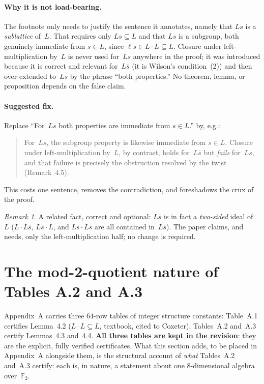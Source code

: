 \documentclass[11pt]{amsart}
\newcommand{\FF}{\mathbb{F}}
\theoremstyle{remark}
\newtheorem*{remarknote}{Remark}
\begin{document}
\paragraph{Why it is not load-bearing.}
The footnote only needs to justify the sentence it annotates, namely
that $Ls$ is a \emph{sublattice} of~$L$.  That requires only
$Ls\subseteq L$ and that $Ls$ is a subgroup, both genuinely
immediate from $s\in L$, since $\ell s\in L\cdot L\subseteq L$.
Closure under left-multiplication by~$L$ is never used for~$Ls$
anywhere in the proof; it was introduced because it is correct and
relevant for~$L\bar s$ (it is Wilson's condition~(2)) and then
over-extended to~$Ls$ by the phrase ``both properties.''  No theorem,
lemma, or proposition depends on the false claim.

\paragraph{Suggested fix.}
Replace ``For~$Ls$ both properties are immediate from $s\in L$.'' by,
e.g.:
\begin{quote}
For~$Ls$, the subgroup property is likewise immediate from $s\in L$.
Closure under left-multiplication by~$L$, by contrast, holds
for~$L\bar s$ but \emph{fails} for~$Ls$, and that failure is
precisely the obstruction resolved by the twist (Remark~4.5).
\end{quote}
This costs one sentence, removes the contradiction, and foreshadows
the crux of the proof.

\begin{remarknote}
A related fact, correct and optional: $L\bar s$ is in fact a
\emph{two-sided} ideal of~$L$ ($L\cdot L\bar s$, $L\bar s\cdot L$, and
$L\bar s\cdot L\bar s$ are all contained in~$L\bar s$).  The paper
claims, and needs, only the left-multiplication half; no change is
required.
\end{remarknote}

\section{The mod-2-quotient nature of Tables A.2 and A.3}

Appendix~A carries three $64$-row tables of integer structure
constants: Table~A.1 certifies Lemma~4.2 ($L\cdot L\subseteq L$,
textbook, cited to Coxeter); Tables~A.2 and~A.3 certify Lemmas~4.3
and~4.4.  \textbf{All three tables are kept in the revision}: they
are the explicit, fully verified certificates.  What this section adds,
to be placed in Appendix~A alongside them, is the structural account of
\emph{what} Tables~A.2 and~A.3 certify: each is, in nature, a statement
about one $8$-dimensional algebra over~$\FF_2$.
\end{document}
